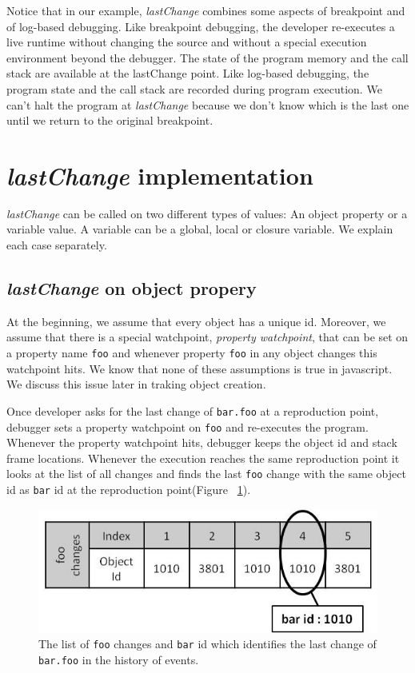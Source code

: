 \documentclass[preprint]{sigplanconf}
\begin{document}
Notice that in our example, \textit{lastChange} combines some aspects of breakpoint and of log-based debugging. Like breakpoint debugging, the developer re-executes a live runtime without changing the source and without a special execution environment beyond the debugger. The state of the program memory and the call stack are available at the lastChange point. Like log-based debugging, the program state and the call stack are recorded during program execution. We can't halt the program at \textit{lastChange} because we don't know which is the last one until we return to the original breakpoint.

\section{\textit{lastChange} implementation}
\textit{lastChange} can be called on two different types of values: An object property or a variable value. A variable can be a global, local or closure variable. We explain each case separately.


\subsection{\textit{lastChange} on object propery}
At the beginning, we assume that every object has a unique id. Moreover, we assume that there is a special watchpoint, \textit{property watchpoint}, that can be set on a property name \texttt{foo} and whenever property \texttt{foo} in any object changes this watchpoint hits. We know that none of these assumptions is true in javascript. We discuss this issue later in traking object creation. 

Once developer asks for the last change of \texttt{bar.foo} at a reproduction point, debugger sets a property watchpoint on \texttt{foo} and  re-executes the program. Whenever the property watchpoint hits, debugger keeps the object id and stack frame locations. Whenever the execution reaches the same reproduction point it looks at the list of all changes and finds the last \texttt{foo} change with the same object id as \texttt{bar} id at the reproduction point(Figure ~\ref{fig:foo-changes1}). 

\begin{figure}[htp]
\includegraphics[width=.48\textwidth]{6-foo-changes1.jpg}
\caption{The list of \texttt{foo} changes and \texttt{bar} id which identifies the last change of \texttt{bar.foo} in the history of events.}
\label{fig:foo-changes1}
\end{figure}
\end{document}
